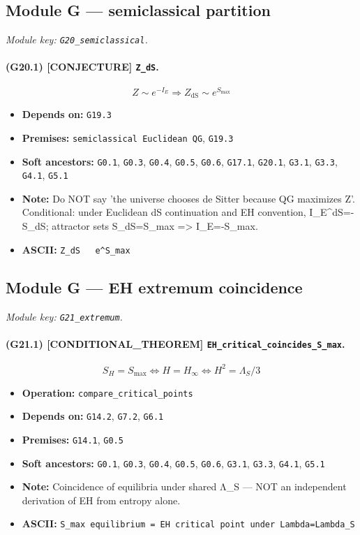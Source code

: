 \documentclass[11pt,a4paper]{article}
\theoremstyle{remark}\newtheorem*{caution}{Caution}
\newcommand{\tagbox}[1]{\textsc{[#1]}}
\begin{document}
\subsection{Module G --- semiclassical partition}
\textit{Module key: \texttt{G20\_semiclassical}.}
\paragraph{(G20.1) \tagbox{CONJECTURE} \texttt{Z\_dS}.}
\begin{equation}
Z\sim e^{-I_E}\Rightarrow Z_{\mathrm{dS}}\sim e^{S_{\max}}
\tag{G20.1}
\end{equation}
\begin{itemize}\setlength{\itemsep}{0.12em}
\item \textbf{Depends on:} \texttt{G19.3}
\item \textbf{Premises:} \texttt{semiclassical Euclidean QG}, \texttt{G19.3}
\item \textbf{Soft ancestors:} \texttt{G0.1}, \texttt{G0.3}, \texttt{G0.4}, \texttt{G0.5}, \texttt{G0.6}, \texttt{G17.1}, \texttt{G20.1}, \texttt{G3.1}, \texttt{G3.3}, \texttt{G4.1}, \texttt{G5.1}
\item \textbf{Note:} Do NOT say 'the universe chooses de Sitter because QG maximizes Z'. Conditional: under Euclidean dS continuation and EH convention, I\_E^{dS}=-S\_dS; attractor sets S\_dS=S\_max => I\_E=-S\_max.
\item \textbf{ASCII:} \texttt{Z\_dS ~ e^{S\_max}}
\end{itemize}
\subsection{Module G --- EH extremum coincidence}
\textit{Module key: \texttt{G21\_extremum}.}
\paragraph{(G21.1) \tagbox{CONDITIONAL\_THEOREM} \texttt{EH\_critical\_coincides\_S\_max}.}
\begin{equation}
S_H=S_{\max}\Leftrightarrow H=H_\infty\Leftrightarrow H^2=\Lambda_S/3
\tag{G21.1}
\end{equation}
\begin{itemize}\setlength{\itemsep}{0.12em}
\item \textbf{Operation:} \texttt{compare\_critical\_points}
\item \textbf{Depends on:} \texttt{G14.2}, \texttt{G7.2}, \texttt{G6.1}
\item \textbf{Premises:} \texttt{G14.1}, \texttt{G0.5}
\item \textbf{Soft ancestors:} \texttt{G0.1}, \texttt{G0.3}, \texttt{G0.4}, \texttt{G0.5}, \texttt{G0.6}, \texttt{G3.1}, \texttt{G3.3}, \texttt{G4.1}, \texttt{G5.1}
\item \textbf{Note:} Coincidence of equilibria under shared Λ\_S — NOT an independent derivation of EH from entropy alone.
\item \textbf{ASCII:} \texttt{S\_max equilibrium = EH critical point under Lambda=Lambda\_S}
\end{itemize}
\end{document}
